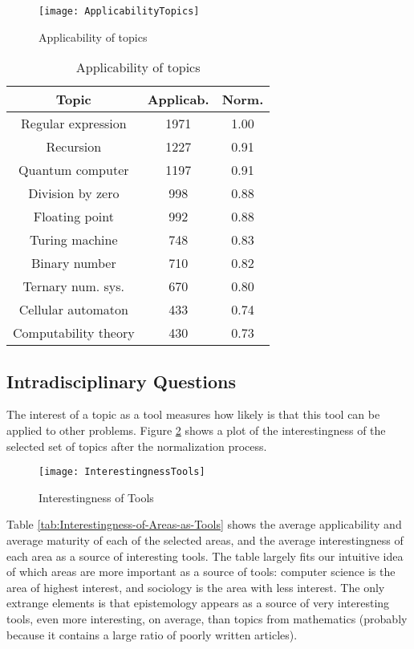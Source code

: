 \begin{figure}[h]
\centering\texttt{[image: ApplicabilityTopics]}
\caption{\label{fig:Applicability-of-Topics}Applicability of topics}
\end{figure}

\begin{table}
\begin{centering}
\begin{tabular}{|c|c|c|}
\hline 
Topic & Applicab. & Norm.\tabularnewline
\hline 
\hline 
Regular expression & 1971 & 1.00\tabularnewline
\hline 
Recursion & 1227 & 0.91\tabularnewline
\hline 
Quantum computer & 1197 & 0.91\tabularnewline
\hline 
Division by zero & 998 & 0.88\tabularnewline
\hline 
Floating point & 992 & 0.88\tabularnewline
\hline 
Turing machine & 748 & 0.83\tabularnewline
\hline 
Binary number & 710 & 0.82\tabularnewline
\hline 
Ternary num. sys. & 670 & 0.80\tabularnewline
\hline 
Cellular automaton & 433 & 0.74\tabularnewline
\hline 
Computability theory & 430 & 0.73\tabularnewline
\hline 
\end{tabular}
\par\end{centering}

\caption{\label{tab:Applicability-of-Topics}Applicability of topics}
\end{table}


\subsection{Intradisciplinary Questions}

The interest of a topic as a tool measures how likely is that this
tool can be applied to other problems. Figure \ref{fig:Interestingness-of-Tools}
shows a plot of the interestingness of the selected set of topics
after the normalization process.

\begin{figure}[h]
\centering\texttt{[image: InterestingnessTools]}
\caption{\label{fig:Interestingness-of-Tools}Interestingness of Tools}
\end{figure}

Table \ref{tab:Interestingness-of-Areas-as-Tools} shows the average applicability and average maturity of each of the selected areas, and the average interestingness of each area as a source of interesting tools. The table largely fits our intuitive idea of which areas are more important as a source of tools: computer science is the area of highest interest, and sociology is the area with less interest. The only extrange elements is that epistemology appears as a source of very interesting tools, even more interesting, on average, than topics from mathematics (probably because it contains a large ratio of poorly written articles).


